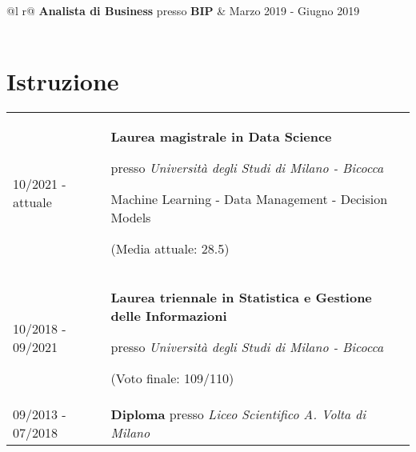 \documentclass[a4paper,12pt]{article}
\begin{document}
\begin{tabularx}{\linewidth}{ @{}l r@{} }
\textbf{Analista di Business} presso \textbf{BIP} & \hfill Marzo 2019 - Giugno 2019 \\[3.75pt]
\\
\end{tabularx}



\section{Istruzione}
\begin{tabularx}{\linewidth}{@{}l X@{}}	
10/2021 - attuale & \textbf{Laurea magistrale in Data Science}

presso \textit{Università degli Studi di Milano - Bicocca}

Machine Learning - Data Management - Decision Models


\hfill \normalsize (Media attuale: 28.5) \\

10/2018 - 09/2021 & \textbf{Laurea triennale in Statistica e Gestione delle Informazioni}

presso \textit{Università degli Studi di Milano - Bicocca}


\hfill (Voto finale: 109/110) \\ 

09/2013 - 07/2018 & \textbf{Diploma} presso \textit{Liceo Scientifico A. Volta di Milano} \\
\end{tabularx}

\end{document}
